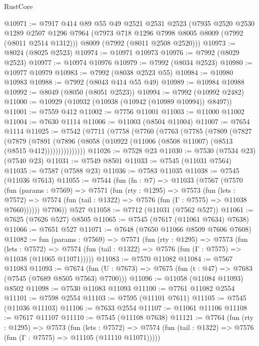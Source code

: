 \begin{lexlean}{RustCore}
\begin{coremodule}
@10971 := @7917
    @414
    @89
    @55
    @49
    @2521
    @2531
    @2523
    (@7935
      @2520
      @2530
      @1289
      @2507
      @1296
      @7964
      (@7973 @718 @1296 @7998 @8005 @8009 (@7992 (@8011 @2514 @1312)))
      @8009
      (@7992 (@8011 @2508 @2520)))
@10973 := @8024 (@8025 @2523)
@10974 := @10971 @10973
@10976 := @7992 (@8029 @2523)
@10977 := @10974 @10976
@10979 := @7992 (@8034 @2523)
@10980 := @10977 @10979
@10983 := @7992 (@8038 @2523 @55)
@10984 := @10980 @10983
@10988 := @7992 (@8043 @414 @55 @49)
@10989 := @10984 @10988
@10992 := @8049 (@8050 (@8051 @2523))
@10994 := @7992 (@10992 @2482)
@11000 := @10929 (@10932 (@10938 (@10942 (@10989 @10994)) @8497))
@11001 := @7559 @412
@11002 := @7756 @11001
@11003 := @11000 @11002
@11004 := @7630 @1114
@11006 := @11003 (@8504 @11004)
@11007 := @7654 @1114
@11025 := @7542
    (@7711
      (@7758
        (@7760
          (@7763
            (@7785
              (@7809
                (@7827
                  (@7879
                    (@7891
                      (@7896 (@8058 (@10922 (@11006 (@8508 @11007) (@8513 (@8515 @412)))))))))))))))
@11026 := @7528 @23
@11030 := @7530 (@7534 @23) (@7540 @23)
@11031 := @7549 @8501
@11033 := @7545 (@11031 @7564)
@11035 := @7587 (@7588 @23)
@11036 := @7583 @11035
@11038 := @7545 (@11036 @7613)
@11055 := @7544
    (fun (fn : @7) =>
    @11033
      (@7567
        (@7570
          (fun (params : @7569) =>
          @7571
            (fun (rty : @1295) =>
            @7573
              (fun (lets : @7572) =>
              @7574 (fun (tail : @1322) => @7576 (fun (Γ : @7575) => @11038 @7660))))))
        @7706))
    @527
@11058 := @7712 (@11031 (@7562 @527))
@11061 := @7625 (@7626 @527) @8505
@11065 := @7545 (@7617 (@11061 @7634) @7638)
@11066 := @7651 @527
@11071 := @7648 (@7650 @11066 @8509 @7606 @7608)
@11082 := fun (params : @7569) =>
  @7571
    (fun (rty : @1295) =>
    @7573
      (fun (lets : @7572) =>
      @7574 (fun (tail : @1322) => @7576 (fun (Γ : @7575) => @11038 (@11065 @11071)))))
@11083 := @7570 @11082
@11084 := @7567 @11083
@11093 := @7674
    (fun (U : @7673) => @7675 (fun (t : @47) => @7683 (@7545 (@7689 @8505 @7563) @7700)))
@11096 := @11058 (@11084 @11093) @8502
@11098 := @7530 @11083 @11093
@11100 := @7761 @11082 @2554
@11101 := @7598 @2554
@11103 := @7595 (@11101 @7611)
@11105 := @7545 (@11036 @11103)
@11106 := @7633 @2554
@11107 := @11061 @11106
@11108 := @7617 @11107
@11110 := @7545 (@11108 @7638)
@11121 := @7764
    (fun (rty : @1295) =>
    @7573
      (fun (lets : @7572) =>
      @7574 (fun (tail : @1322) => @7576 (fun (Γ : @7575) => @11105 (@11110 @11071)))))

\end{coremodule}
\end{lexlean}
